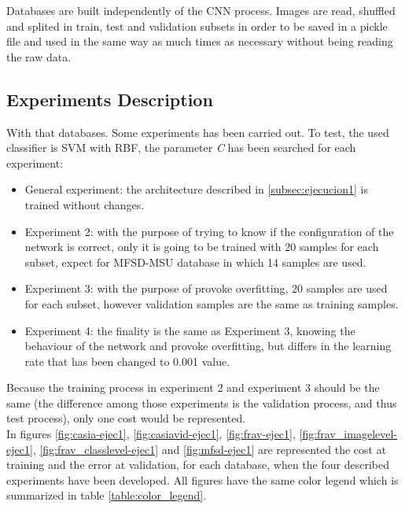 Databases are built independently of the CNN process. Images are read, shuffled and splited in train, test and validation subsets in order to be saved in a pickle file and used in the same way as much times as necessary without being reading the raw data.

\subsection{Experiments Description} \label{sec:experiments_ejec1}
With that databases. Some experiments has been carried out. To test, the used classifier is SVM with RBF, the parameter \textit{C} has been searched for each experiment:
\begin{itemize}
\item General experiment: the architecture described in \ref{subsec:ejecucion1} is trained without changes.
\item Experiment 2: with the purpose of trying to know if the configuration of the network is correct, only it is going to be trained with 20 samples for each subset, expect for MFSD-MSU database in which 14 samples are used.
\item Experiment 3: with the purpose of provoke overfitting, 20 samples are used for each subset, however validation samples are the same as training samples.
\item Experiment 4: the finality is the same as Experiment 3, knowing the behaviour of the network and provoke overfitting, but differs in the learning rate that has been changed to 0.001 value. \\
\end{itemize}


Because the training process in experiment 2 and experiment 3 should be the same (the difference among those experiments is the validation process, and thus test process), only one cost would be represented.\\

In figures \ref{fig:casia-ejec1}, \ref{fig:casiavid-ejec1}, \ref{fig:frav-ejec1}, \ref{fig:frav_imagelevel-ejec1}, \ref{fig:frav_classlevel-ejec1} and \ref{fig:mfsd-ejec1} are represented the cost at training and the error at validation, for each database, when the four described experiments have been developed. All figures have the same color legend which is summarized in table \ref{table:color_legend}.\\

